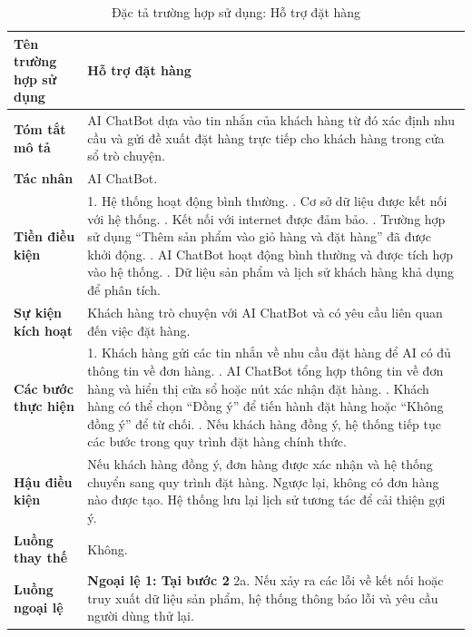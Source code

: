 {
\begin{longtable}{|>{\bfseries}p{4cm}|p{11.5cm}|}
\caption{Đặc tả trường hợp sử dụng: Hỗ trợ đặt hàng}
\label{tab:uc-chatbot-order-support} \\
\hline
\textbf{Tên trường hợp sử dụng} & Hỗ trợ đặt hàng \\
\hline
\textbf{Tóm tắt mô tả} & AI ChatBot dựa vào tin nhắn của khách hàng từ đó xác định nhu cầu và gửi đề xuất đặt hàng trực tiếp cho khách hàng trong cửa sổ trò chuyện. \\
\hline
\textbf{Tác nhân} & AI ChatBot. \\
\hline
\textbf{Tiền điều kiện} & 1. Hệ thống hoạt động bình thường. \newline
2. Cơ sở dữ liệu được kết nối với hệ thống. \newline
3. Kết nối với internet được đảm bảo. \newline
4. Trường hợp sử dụng “Thêm sản phẩm vào giỏ hàng và đặt hàng” đã được khởi động. \newline
5. AI ChatBot hoạt động bình thường và được tích hợp vào hệ thống. \newline
6. Dữ liệu sản phẩm và lịch sử khách hàng khả dụng để phân tích. \\
\hline
\textbf{Sự kiện kích hoạt} & Khách hàng trò chuyện với AI ChatBot và có yêu cầu liên quan đến việc đặt hàng. \\
\hline
\textbf{Các bước thực hiện} & 1. Khách hàng gửi các tin nhắn về nhu cầu đặt hàng để AI có đủ thông tin về đơn hàng. \newline
2. AI ChatBot tổng hợp thông tin về đơn hàng và hiển thị cửa sổ hoặc nút xác nhận đặt hàng. \newline
3. Khách hàng có thể chọn “Đồng ý” để tiến hành đặt hàng hoặc “Không đồng ý” để từ chối. \newline
4. Nếu khách hàng đồng ý, hệ thống tiếp tục các bước trong quy trình đặt hàng chính thức. \\
\hline
\textbf{Hậu điều kiện} & Nếu khách hàng đồng ý, đơn hàng được xác nhận và hệ thống chuyển sang quy trình đặt hàng. Ngược lại, không có đơn hàng nào được tạo. Hệ thống lưu lại lịch sử tương tác để cải thiện gợi ý. \\
\hline
\textbf{Luồng thay thế} & Không. \\
\hline
\textbf{Luồng ngoại lệ} & \textbf{Ngoại lệ 1: Tại bước 2} \newline
2a. Nếu xảy ra các lỗi về kết nối hoặc truy xuất dữ liệu sản phẩm, hệ thống thông báo lỗi và yêu cầu người dùng thử lại. \\
\hline
\end{longtable}

}
